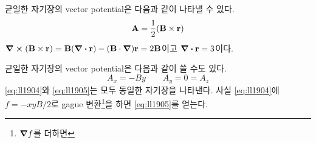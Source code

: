 균일한 자기장의 vector potential은 다음과 같이 나타낼 수 있다.
\begin{equation}\label{eq:ll1904}
    \vb{A} = \frac{1}{2} ( \vb{B} \times \vb{r} )
\end{equation}
$ \curl (\vb{B} \times \vb{r}) = \vb{B} (\div \vb{r}) - ( \vb{B} \cdot \grad) \vb{r} = 2 \vb{B} $이고 $ 
\div \vb{r} = 3$이다.

균일한 자기장의 vector potential은 다음과 같이 쓸 수도 있다.
\begin{equation}\label{eq:ll1905}
    A_x = - B y \qquad A_y = 0 = A_z
\end{equation}
\eqref{eq:ll1904}와 \eqref{eq:ll1905}는 모두 동일한 자기장을 나타낸다. 사실 \eqref{eq:ll1904}에 $ f = -x y B / 2 $로 gague 변환\footnote{$ \grad f $를 더하면}을 하면 \eqref{eq:ll1905}를 얻는다.
